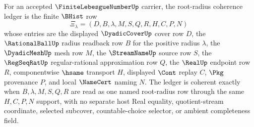 \begin{definition}
\label{def:finite-lebesgue-number-root-radius-coherence-ledger}
For an accepted $\FiniteLebesgueNumberUp$ carrier, the root-radius coherence ledger is the finite $\BHist$ row
$$
\Xi_{\lambda}=(D,B,\lambda,M,S,Q,R,H,C,P,N)
$$
whose entries are the displayed $\DyadicCoverUp$ cover row $D$, the $\RationalBallUp$ radius readback row $B$ for the positive radius $\lambda$, the $\DyadicMeshUp$ mesh row $M$, the $\StreamNameUp$ source row $S$, the $\RegSeqRatUp$ regular-rational approximation row $Q$, the $\RealUp$ endpoint row $R$, componentwise $\hsame$ transport $H$, displayed $\Cont$ replay $C$, $\Pkg$ provenance $P$, and local $\NameCert$ naming $N$. The ledger is coherent exactly when $B,\lambda,M,S,Q,R$ are read as one named root-radius row through the same $H,C,P,N$ support, with no separate host Real equality, quotient-stream coordinate, selected subcover, countable-choice selector, or ambient completeness field.
\end{definition}

